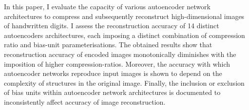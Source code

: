 

In this paper, I evaluate the capacity of various autoencoder network architectures to compress and subsequently reconstruct high-dimensional images of handwritten digits.
I assess the reconstruction accuracy of 14 distinct autoencoders architectures, each imposing a distinct combination of compression ratio and bias-unit parameterisations.
The obtained results show that reconstruction accuracy of encoded images monotonically diminishes with the imposition of higher compression-ratios.
Moreover, the accuracy with which autoencoder networks reproduce input images is shown to depend on the complexity of structures in the original image.
Finally, the inclusion or exclusion of bias units within autoencoder network architectures is documented to inconsistently affect accuracy of image reconstruction.
